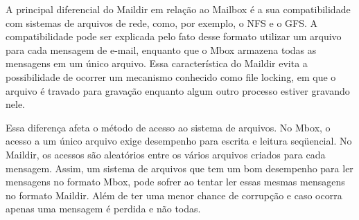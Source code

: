 A principal diferencial do Maildir em relação ao Mailbox é a sua compatibilidade com sistemas de arquivos de rede, como, por exemplo, o NFS e o GFS. A compatibilidade pode ser explicada pelo fato desse formato utilizar um arquivo para cada mensagem de e-mail, enquanto que o Mbox armazena todas as mensagens em um único arquivo. Essa característica do Maildir evita a possibilidade de ocorrer um mecanismo conhecido como file locking, em que o arquivo é travado para gravação enquanto algum outro processo estiver gravando nele.

Essa diferença afeta o método de acesso ao sistema de arquivos. No Mbox, o acesso a um único arquivo exige desempenho para escrita e leitura seqüencial. No Maildir, os acessos são aleatórios entre os vários arquivos criados para cada mensagem. Assim, um sistema de arquivos que tem um bom desempenho para ler mensagens no formato Mbox, pode sofrer ao tentar ler essas mesmas mensagens no formato Maildir. Além de ter uma menor chance de corrupção e caso ocorra apenas uma mensagem é perdida e não todas.
